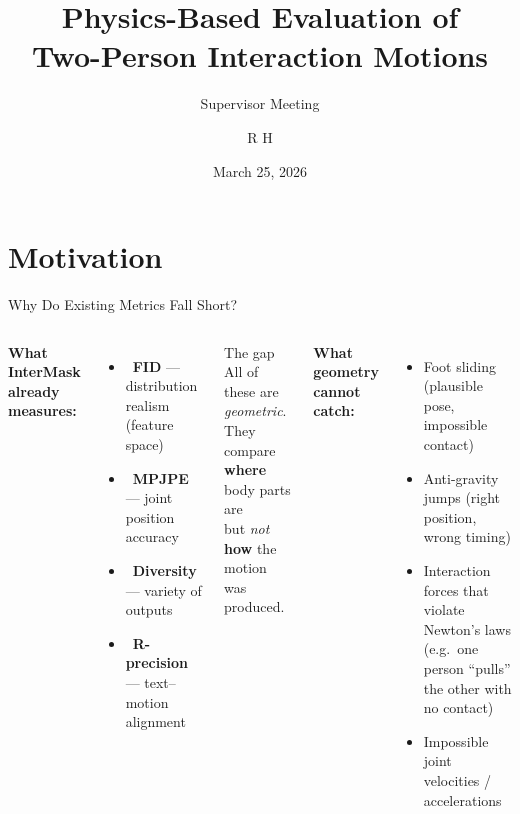 \documentclass[aspectratio=169, 10pt]{beamer}
\title[Physics Evaluation for Interaction Motions]{%
  \textbf{Physics-Based Evaluation of\\Two-Person Interaction Motions}}
\subtitle{Supervisor Meeting}
\author{R H}
\date{March 25, 2026}
\institute{InterMask / Newton Physics Project}
\newcommand{\tick}{\textcolor{mlgreen}{\checkmark}}
\newcommand{\cross}{\textcolor{warnred}{$\times$}}
\begin{document}

\begin{frame}
  \titlepage
\end{frame}

\section{Motivation}

\begin{frame}{Why Do Existing Metrics Fall Short?}
  \begin{columns}[T]
      \textbf{What InterMask already measures:}
      \vspace{0.3em}
      \begin{itemize}
        \item \tick\ \textbf{FID} --- distribution realism (feature space)
        \item \tick\ \textbf{MPJPE} --- joint position accuracy
        \item \tick\ \textbf{Diversity} --- variety of outputs
        \item \tick\ \textbf{R-precision} --- text--motion alignment
      \end{itemize}

      \vspace{0.8em}
      \begin{alertblock}{The gap}
        All of these are \emph{geometric}.\\
        They compare \textbf{where} body parts are\\
        but \emph{not} \textbf{how} the motion was produced.
      \end{alertblock}

      \textbf{What geometry cannot catch:}
      \vspace{0.3em}
      \begin{itemize}
        \item[\cross] Foot sliding (plausible pose, impossible contact)
        \item[\cross] Anti-gravity jumps (right position, wrong timing)
        \item[\cross] Interaction forces that violate Newton's laws\\
                      (e.g.\ one person ``pulls'' the other with no contact)
        \item[\cross] Impossible joint velocities / accelerations
      \end{itemize}


\end{columns}
\end{frame}
\end{document}
